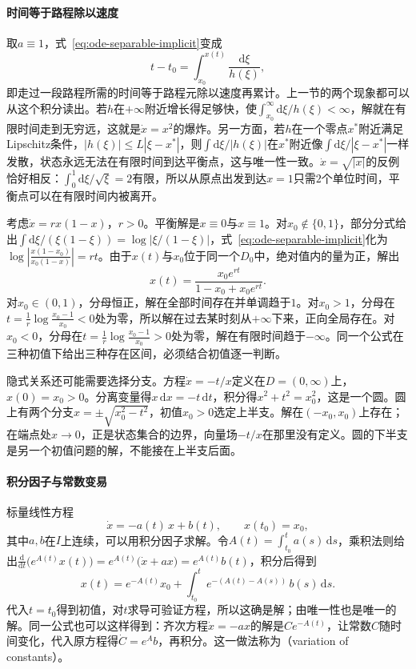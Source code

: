 \paragraph{时间等于路程除以速度}
取$a\equiv1$，式~\eqref{eq:ode-separable-implicit}变成
\[
  t-t_0=\int_{x_0}^{x(t)}\frac{\mathrm d\xi}{h(\xi)},
\]
即走过一段路程所需的时间等于路程元除以速度再累计。上一节的两个现象都可以从这个积分读出。若$h$在$+\infty$附近增长得足够快，使$\int_{x_0}^{\infty}\mathrm d\xi/h(\xi)<\infty$，解就在有限时间走到无穷远，这就是$\dot x=x^2$的爆炸。另一方面，若$h$在一个零点$x^\ast$附近满足Lipschitz条件，$|h(\xi)|\leq L|\xi-x^\ast|$，则$\int\mathrm d\xi/|h(\xi)|$在$x^\ast$附近像$\int\mathrm d\xi/|\xi-x^\ast|$一样发散，状态永远无法在有限时间到达平衡点，这与唯一性一致。$\dot x=\sqrt{|x|}$的反例恰好相反：$\int_0^1\mathrm d\xi/\sqrt\xi=2$有限，所以从原点出发到达$x=1$只需$2$个单位时间，平衡点可以在有限时间内被离开。

\begin{example}[Logistic方程]
  \label{ex:ode-logistic}
  考虑$\dot x=rx(1-x)$，$r>0$。平衡解是$x\equiv0$与$x\equiv1$。对$x_0\notin\{0,1\}$，部分分式给出$\int\mathrm d\xi/(\xi(1-\xi))=\log|\xi/(1-\xi)|$，式~\eqref{eq:ode-separable-implicit}化为$\log\left|\frac{x(1-x_0)}{x_0(1-x)}\right|=rt$。由于$x(t)$与$x_0$位于同一个$D_0$中，绝对值内的量为正，解出
  \[
    x(t)=\frac{x_0e^{rt}}{1-x_0+x_0e^{rt}}.
  \]
  对$x_0\in(0,1)$，分母恒正，解在全部时间存在并单调趋于$1$。对$x_0>1$，分母在$t=\frac1r\log\frac{x_0-1}{x_0}<0$处为零，所以解在过去某时刻从$+\infty$下来，正向全局存在。对$x_0<0$，分母在$t=\frac1r\log\frac{x_0-1}{x_0}>0$处为零，解在有限时间趋于$-\infty$。同一个公式在三种初值下给出三种存在区间，必须结合初值逐一判断。
\end{example}

隐式关系还可能需要选择分支。方程$\dot x=-t/x$定义在$D=(0,\infty)$上，$x(0)=x_0>0$。分离变量得$x\,\mathrm dx=-t\,\mathrm dt$，积分得$x^2+t^2=x_0^2$，这是一个圆。圆上有两个分支$x=\pm\sqrt{x_0^2-t^2}$，初值$x_0>0$选定上半支。解在$(-x_0,x_0)$上存在；在端点处$x\to0$，正是状态集合的边界，向量场$-t/x$在那里没有定义。圆的下半支是另一个初值问题的解，不能接在上半支后面。

\paragraph{积分因子与常数变易}
标量线性方程
\begin{equation}
  \dot x=-a(t)\,x+b(t),\qquad x(t_0)=x_0,
  \label{eq:ode-scalar-linear}
\end{equation}
其中$a,b$在$I$上连续，可以用积分因子求解。令$A(t)=\int_{t_0}^ta(s)\,\mathrm ds$，乘积法则给出$\frac{\mathrm d}{\mathrm dt}\bigl(e^{A(t)}x(t)\bigr)=e^{A(t)}\bigl(\dot x+a x\bigr)=e^{A(t)}b(t)$，积分后得到
\begin{equation}
  x(t)=e^{-A(t)}x_0+\int_{t_0}^te^{-(A(t)-A(s))}\,b(s)\,\mathrm ds.
  \label{eq:ode-scalar-variation}
\end{equation}
代入$t=t_0$得到初值，对$t$求导可验证方程，所以这确是解；由唯一性也是唯一的解。同一公式也可以这样得到：齐次方程$\dot x=-ax$的解是$Ce^{-A(t)}$，让常数$C$随时间变化，代入原方程得$\dot C=e^{A}b$，再积分。这一做法称为（variation of constants）。

